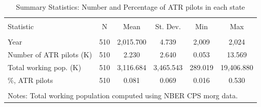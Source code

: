 
\begin{table}[!htbp] \centering 
  \caption{Summary Statistics: Number and Percentage of ATR pilots in each state} 
  \label{} 
\small 
\begin{tabular}{@{\extracolsep{5pt}}lccccc} 
\\[-1.8ex]\hline 
\hline \\[-1.8ex] 
Statistic & \multicolumn{1}{c}{N} & \multicolumn{1}{c}{Mean} & \multicolumn{1}{c}{St. Dev.} & \multicolumn{1}{c}{Min} & \multicolumn{1}{c}{Max} \\ 
\hline \\[-1.8ex] 
Year & 510 & 2,015.700 & 4.739 & 2,009 & 2,024 \\ 
Number of ATR pilots (K) & 510 & 2.230 & 2.640 & 0.053 & 13.569 \\ 
Total working pop. (K) & 510 & 3,116.684 & 3,465.543 & 289.019 & 19,406.880 \\ 
\%, ATR pilots & 510 & 0.081 & 0.069 & 0.016 & 0.530 \\ 
\hline \\[-1.8ex] 
\multicolumn{6}{l}{Notes: Total working population computed using NBER CPS morg data.} \\ 
\end{tabular} 
\end{table} 
